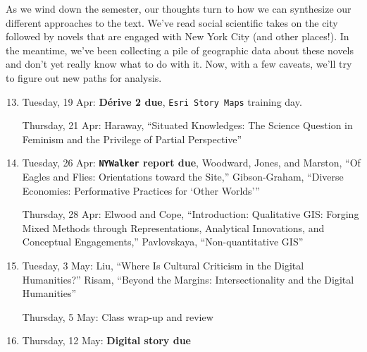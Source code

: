 As we wind down the semester, our thoughts turn to how we can synthesize our
different approaches to the text. We’ve read social scientific takes on the
city followed by novels that are engaged with New York City (and other
places!). In the meantime, we’ve been collecting a pile of geographic data
about these novels and don’t yet really know what to do with it. Now, with a
few caveats, we’ll try to figure out new paths for analysis.

\begin{enumerate}
  \setcounter{enumi}{12}

  \item Tuesday, 19 Apr: \textbf{\small Dérive 2 due}, \texttt{Esri Story Maps} training day.

    Thursday, 21 Apr: Haraway, “Situated Knowledges: The Science Question in Feminism and the Privilege of Partial Perspective”

  \item Tuesday, 26 Apr: \textbf{\texttt{NYWalker} \small report due}, Woodward, Jones, and Marston, “Of Eagles and Flies: Orientations toward the Site,” Gibson-Graham, “Diverse Economies: Performative Practices for ‘Other Worlds’”

    Thursday, 28 Apr: Elwood and Cope, “Introduction: Qualitative GIS: Forging Mixed Methods through Representations, Analytical Innovations, and Conceptual Engagements,”  Pavlovskaya, “Non-quantitative GIS”

  \item Tuesday, 3 May: Liu, “Where Is Cultural Criticism in the Digital Humanities?” Risam, “Beyond the Margins: Intersectionality and the Digital Humanities”

    Thursday, 5 May: Class wrap-up and review

  \item Thursday, 12 May: \textbf{\small Digital story due}

\end{enumerate}
